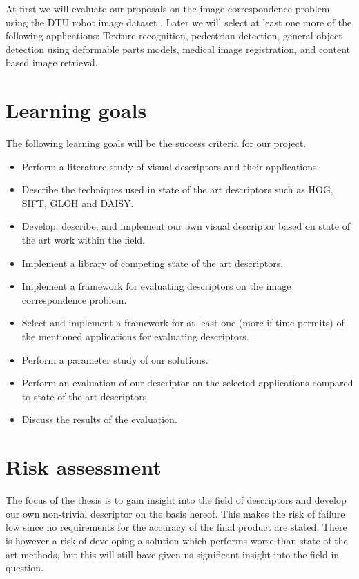 \documentclass[11pt,a4paper]{article}
\begin{document}
At first we will evaluate our
proposals on the image correspondence problem using the DTU robot image
dataset \cite{aanaes2012interesting}. Later we will select at least
one more of the following applications: Texture recognition, pedestrian
detection, general object detection using deformable parts models, medical
image registration, and content based image retrieval.

\section{Learning goals}
The following learning goals will be the success criteria for our
project.
\begin{itemize}
    \item Perform a literature study of visual descriptors and their
        applications.
    \item Describe the techniques used in state of the art descriptors such as
        HOG, SIFT, GLOH and DAISY.
    \item Develop, describe, and implement our own visual descriptor based on
        state of the art work within the field.
    \item Implement a library of competing state of the art descriptors.
    \item Implement a framework for evaluating descriptors on the image
        correspondence problem.
    \item Select and implement a framework for at least one (more if time
        permits) of the mentioned applications for evaluating descriptors.
    \item Perform a parameter study of our solutions.
    \item Perform an evaluation of our descriptor on the selected
        applications compared to state of the art descriptors.
    \item Discuss the results of the evaluation.
\end{itemize}

\section{Risk assessment}
The focus of the thesis is to gain insight into the field of descriptors
and develop our own non-trivial descriptor on the basis hereof. This makes
the risk of failure low since no requirements for the accuracy of the final
product are stated. There is however a risk of developing a solution which
performs worse than state of the art methods, but this will still have given
us significant insight into the field in question.
\end{document}

